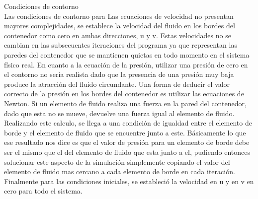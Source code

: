 \begin{section}{Condiciones de contorno}
~\\
Las condiciones de contorno para Las ecuaciones de velocidad no presentan mayores complejidades, se establece la velocidad del fluido en los bordes del contenedor como cero en ambas direcciones, u y v. Estas velocidades no se cambian en las subsecuentes iteraciones del programa ya que representan las paredes del contenedor que se mantienen quietas en todo momento en el sistema físico real.
En cuanto a la ecuación de la presión, utilizar una presión de cero en el contorno no seria realista dado que la presencia de una  presión muy baja produce la atracción del fluido circundante. Una forma de deducir el valor correcto de la presión en los bordes del contenedor es utilizar las ecuaciones de Newton. Si un elemento de fluido realiza una fuerza en la pared del contenedor, dado que esta no se mueve, devuelve una fuerza igual al elemento de fluido. Realizando este calculo, se llega a una condición de igualdad entre el elemento de borde y el elemento de fluido que se encuentre junto a este. Básicamente lo que ese resultado nos dice es que el valor de presión para un elemento de borde debe ser el mismo que el del elemento de fluido que esta junto a el, pudiendo entonces solucionar este aspecto de la simulación simplemente copiando el valor del elemento de fluido mas cercano a cada elemento de borde en cada iteración.\\
Finalmente para las condiciones iniciales, se estableció la velocidad en u y en v en cero para todo el sistema.

\end{section}
